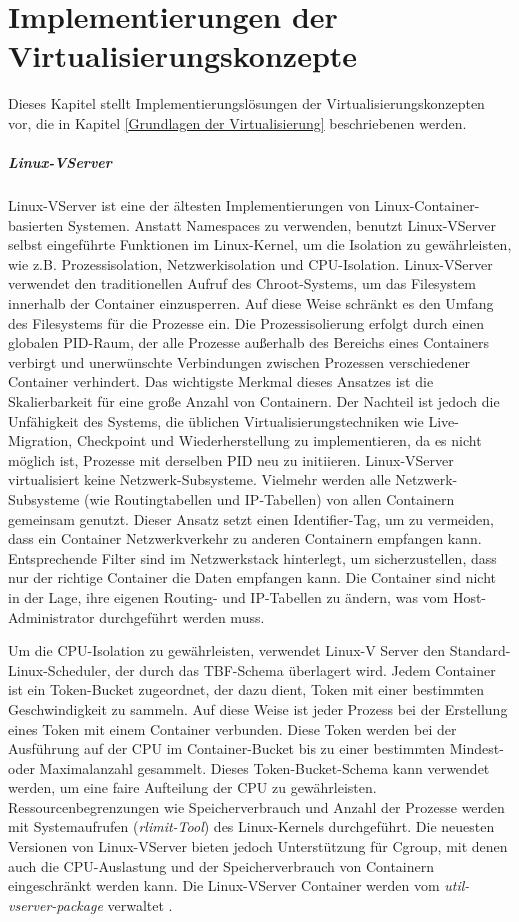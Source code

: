 \thispagestyle{empty}

\section{Implementierungen der Virtualisierungskonzepte}

Dieses Kapitel stellt Implementierungslösungen der Virtualisierungskonzepten vor, die in Kapitel \ref{Grundlagen der Virtualisierung} beschriebenen werden.

\subparagraph{Linux-VServer}
Linux-VServer ist eine der ältesten Implementierungen von Linux-Container-basierten Systemen. Anstatt Namespaces zu verwenden, benutzt Linux-VServer selbst eingeführte Funktionen im Linux-Kernel, um die Isolation zu gewährleisten, wie z.B. Prozessisolation, Netzwerkisolation und CPU-Isolation. Linux-VServer verwendet den traditionellen Aufruf des Chroot-Systems, um das Filesystem innerhalb der Container einzusperren. Auf diese Weise schränkt es den Umfang des Filesystems für die Prozesse ein. Die Prozessisolierung erfolgt durch einen globalen PID-Raum, der alle Prozesse außerhalb des Bereichs eines Containers verbirgt und unerwünschte Verbindungen zwischen Prozessen verschiedener Container verhindert. Das wichtigste Merkmal dieses Ansatzes ist die Skalierbarkeit für eine große Anzahl von Containern. Der Nachteil ist jedoch die Unfähigkeit des Systems, die üblichen Virtualisierungstechniken wie Live-Migration, Checkpoint und Wiederherstellung zu implementieren, da es nicht möglich ist, Prozesse mit derselben PID neu zu initiieren. Linux-VServer virtualisiert keine Netzwerk-Subsysteme. Vielmehr werden alle Netzwerk-Subsysteme (wie Routingtabellen und IP-Tabellen) von allen Containern gemeinsam genutzt. Dieser Ansatz setzt einen Identifier-Tag, um zu vermeiden, dass ein Container Netzwerkverkehr zu anderen Containern empfangen kann. Entsprechende Filter sind im Netzwerkstack hinterlegt, um sicherzustellen, dass nur der richtige Container die Daten empfangen kann. Die Container sind nicht in der Lage, ihre eigenen Routing- und IP-Tabellen zu ändern, was vom Host-Administrator durchgeführt werden muss. 

Um die CPU-Isolation zu gewährleisten, verwendet Linux-V Server den Standard-Linux-Scheduler, der durch das \ac{TBF}-Schema überlagert wird. Jedem Container ist ein Token-Bucket zugeordnet, der dazu dient, Token mit einer bestimmten Geschwindigkeit zu sammeln. Auf diese Weise ist jeder Prozess bei der Erstellung eines Token mit einem Container verbunden. Diese Token werden bei der Ausführung auf der CPU im Container-Bucket bis zu einer bestimmten Mindest- oder Maximalanzahl gesammelt. Dieses Token-Bucket-Schema kann verwendet werden, um eine faire Aufteilung der CPU zu gewährleisten. Ressourcenbegrenzungen wie Speicherverbrauch und Anzahl der Prozesse werden mit Systemaufrufen (\emph{rlimit-Tool}) des Linux-Kernels durchgeführt. Die neuesten Versionen von Linux-VServer bieten jedoch Unterstützung für Cgroup, mit denen auch die CPU-Auslastung und der Speicherverbrauch von Containern eingeschränkt werden kann. Die Linux-VServer Container werden vom \emph{util-vserver-package} \cite{Optionen2018Userspace-WerkzeugeLinux-VServer}  verwaltet \cite{Overview2018PaperLinux-VServer} \cite{Xavier2015AClouds}.


